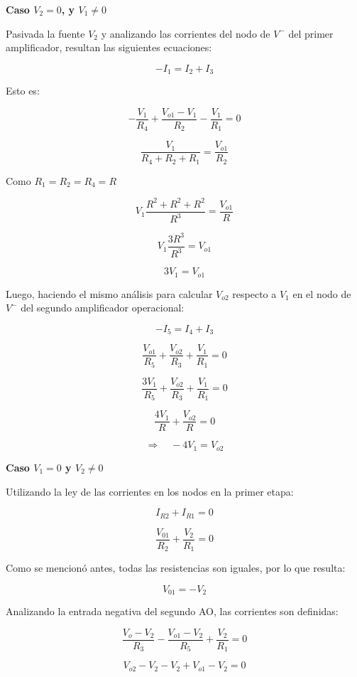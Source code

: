 \textbf{Caso $V_2=0$, y $V_1 \neq 0$} 
\vspace{1em}

Pasivada la fuente $V_2$ y analizando las corrientes del nodo de $V^-$ del primer amplificador, resultan las siguientes ecuaciones:

\[-I_1 = I_2 + I_3\]

Esto es: 

\[-\frac{V_1}{R_4} + \frac{V_{o1}-V_1}{R_2} - \frac{V_1}{R_1} = 0\]

\[\frac{V_1}{R_4 + R_2 + R_1}      = \frac{V_{o1}}{R_2}\]

Como $R_1 = R_2 = R_4 = R$

\[V_1\frac{R^2 +R^2 + R^2}{R^3} = \frac{V_{o1}}{R} \]
      
\[V_1 \frac{3R^3}{R^3} = V_{o1} \]

\vspace{1em}

\[3V_1 = V_{o1}\]

Luego, haciendo el mismo análisis para calcular $V_{o2}$ respecto a $V_1$ en el nodo de $V^-$ del segundo amplificador operacional:

\[-I_5 = I_4 + I_3\]

\[\frac{V_{o1}}{R_5} + \frac{V_{o2}}{R_3} + \frac{V_1}{R_1} = 0\]

\[\frac{3V_1}{R_5} + \frac{V_{o2}}{R_3} + \frac{V_1}{R_1} = 0\]

\[\frac{4V_1}{R} + \frac{V_{o2}}{R} = 0\]

\[\Rightarrow \quad -4V_1 = V_{o2} \]

\vspace{1em}

\textbf{Caso $V_1 = 0$ y $V_2 \neq 0$} 

\vspace{1em}

Utilizando la ley de las corrientes en los nodos en la primer etapa:

\[I_{R2} + I_{R1} = 0 \]

\[\frac{V_{01}}{R_2} + \frac{V_2}{R_1} = 0 \]

Como se mencionó antes, todas las resistencias son iguales, por lo que resulta:

\[{V_{01}} = - V_2 \]

Analizando la entrada negativa del segundo AO, las corrientes son definidas:

\[\frac{V_o-V_2}{R_3} - \frac{V_{o1}-V_2}{R_5}+\frac{V_2}{R_1} = 0 \]

\[ V_{o2} - V_2 - V_2 + V_{o1} - V_2 = 0 \]

